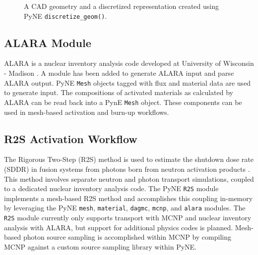 \documentclass{anstrans}
\begin{document}
\begin{figure}
\centering
{}
\caption{A CAD geometry and a
discretized representation created using PyNE \texttt{discretize\_geom()}.}
\label{mobius}
\end{figure}


\subsection{ALARA Module}

ALARA is a nuclear inventory analysis code developed at University of Wisconsin
- Madison \cite{wilson_validation_1998}. A module has been added to generate
  ALARA input and parse ALARA output. PyNE
\texttt{Mesh} objects tagged with flux and material data are used to generate
input. The compositions of activated materials as calculated by
ALARA can be read back into a PynE \texttt{Mesh} object. These components can be used
in mesh-based activation and burn-up workflows.

\subsection{R2S Activation Workflow}

The Rigorous Two-Step (R2S) method is used to estimate the shutdown dose rate
(SDDR) in fusion systems from photons born from neutron activation products
\cite{chen_rigorous_2002}. This method involves separate neutron and photon
transport simulations, coupled to a dedicated nuclear inventory analysis code.
The PyNE \texttt{R2S} module implements a mesh-based R2S method and
accomplishes this coupling in-memory by leveraging the PyNE \texttt{mesh},
\texttt{material}, \texttt{dagmc}, \texttt{mcnp}, and \texttt{alara} modules.
The \texttt{R2S} module currently only supports transport with MCNP and nuclear
inventory analysis with ALARA, but support for additional physics codes is
planned. Mesh-based photon source sampling is accomplished within MCNP by
compiling MCNP against a custom source sampling library within PyNE.
\end{document}
